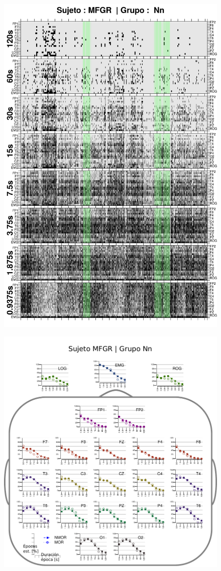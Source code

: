 \begin{figure}
\centering
\includegraphics[width=0.9\linewidth]
{./img_ejemplos/GURM251148SUE_comp_est_.png} 
\end{figure}

\begin{figure}
\centering
\includegraphics[width=.9\linewidth]{./img_resultados/cabeza_MFGR.pdf}
\end{figure}

